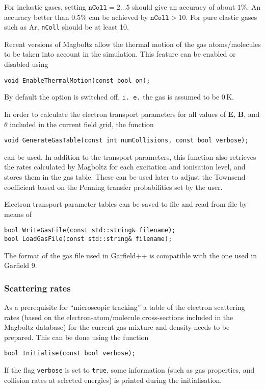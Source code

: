 For inelastic gases, setting \(\texttt{nColl} = 2 \dots 5\)
should give an accuracy of about \(1\%\). 
An accuracy better than \(0.5\%\) can be achieved by 
\(\texttt{nColl} > 10\). 
For pure elastic gases such as Ar, \texttt{nColl} should 
be at least 10.  

Recent versions of Magboltz allow the thermal motion of the gas 
atoms/molecules to be taken into account in the simulation. 
This feature can be enabled or disabled using
\begin{lstlisting}
void EnableThermalMotion(const bool on);
\end{lstlisting} 
By default the option is switched off, \texttt{i. e.} the gas 
is assumed to be 0\,K. 

In order to calculate the electron transport parameters 
for all values of \(\mathbf{E}\), \(\mathbf{B}\), 
and \(\theta\) included in the current field grid, 
the function
\begin{lstlisting}
void GenerateGasTable(const int numCollisions, const bool verbose);
\end{lstlisting}
can be used. In addition to the transport parameters, this function also 
retrieves the rates calculated by Magboltz for each excitation and 
ionisation level, and stores them in the gas table. These can be used 
later to adjust the Townsend coefficient based on the Penning transfer 
probabilities set by the user.
 
Electron transport parameter tables can be saved to file 
and read from file by means of
\begin{lstlisting}
bool WriteGasFile(const std::string& filename);
bool LoadGasFile(const std::string& filename);
\end{lstlisting}

The format of the gas file used in Garfield++ is compatible with the 
one used in Garfield 9. 

\subsubsection{Scattering rates}

As a prerequisite for ``microscopic tracking'' a 
table of the electron scattering rates 
(based on the electron-atom/molecule cross-sections included in the 
Magboltz database) for the 
current gas mixture and density needs to be prepared. 
This can be done using the function 
\begin{lstlisting}
bool Initialise(const bool verbose);
\end{lstlisting}
If the flag \texttt{verbose} is set to \texttt{true}, 
some information (such as gas properties, and collision rates at selected 
energies) is printed during the initialisation.  

